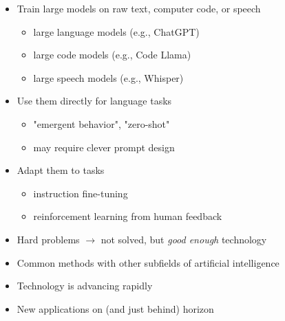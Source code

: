 \documentclass[landscape]{jhuslides3C}
\begin{document}

\vfill
\begin{itemize}
\item Train large models on raw text, computer code, or speech
\begin{itemize}
\item large language models (e.g., ChatGPT)
\item large code models (e.g., Code Llama)
\item large speech models (e.g., Whisper)
\end{itemize}
\item Use them directly for language tasks
\begin{itemize}
\item "emergent behavior", "zero-shot"
\item may require clever prompt design
\end{itemize}
\item Adapt them to tasks
\begin{itemize}
\item instruction fine-tuning
\item reinforcement learning from human feedback
\end{itemize}
\end{itemize}
\vfill


\vfill
\begin{itemize}
\item Hard problems $\rightarrow$ not solved, but {\em good enough} technology
\item Common methods with other subfields of artificial intelligence
\item Technology is advancing rapidly
\item New applications on (and just behind) horizon
\end{itemize}
\vfill

\end{document}
